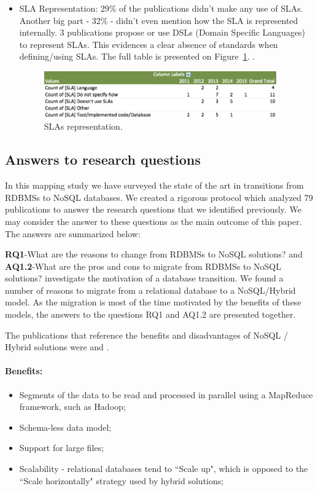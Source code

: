 \documentclass[conference, 10pt, a4paper]{IEEEtran}
\begin{document}
\begin{itemize}
\item{SLA Representation: }
29\% of the publications didn't make any use of SLAs. Another big part - 32\% - didn't even mention how the SLA is represented internally. 3 publications propose or use DSLs (Domain Specific Languages) to represent SLAs. This evidences a clear absence of standards when defining/using SLAs. The full table is presented on Figure~\ref{fig:slaRepresentation}. \cite{fullDBJson}.
\begin{figure}%
\centering
\includegraphics[width=100mm]{graph4.png}
\caption{SLAs representation.\label{fig:slaRepresentation}}
\end{figure}



\end{itemize}



\subsection{Answers to research questions}

In this mapping study we have surveyed the state of the art in transitions from RDBMSs to NoSQL databases. We created a rigorous protocol which analyzed 79 publications to answer the research questions that we identified previously. We may consider the answer to these questions as the main outcome of this paper. The answers are summarized below:
\bigskip

\noindent\textbf{RQ1}-What are the reasons to change from RDBMSs to NoSQL solutions?  and \textbf{AQ1.2}-What are the pros and cons to migrate from RDBMSs to NoSQL solutions? investigate the motivation of a database transition. We found a number of reasons to migrate from a relational database to a NoSQL/Hybrid model. As the migration is most of the time motivated by the benefits of these models, the answers to the questions RQ1 and AQ1.2 are presented together. 

 The publications that reference the benefits and disadvantages of NoSQL / Hybrid solutions  were \cite{Schram:2012:MND:2384716.2384773} \cite{buazuartransition} and \cite{gomez2014building}.

\paragraph*{Benefits:} 
\begin{itemize}
  \item Segments of the data to be read and processed in parallel using a MapReduce framework, such as Hadoop;
  \item Schema-less data model;
  \item Support for large files;
  \item Scalability - relational databases tend to ``Scale up", which is opposed to the ``Scale horizontally" strategy used by hybrid solutions;
\end{itemize}
\end{document}
